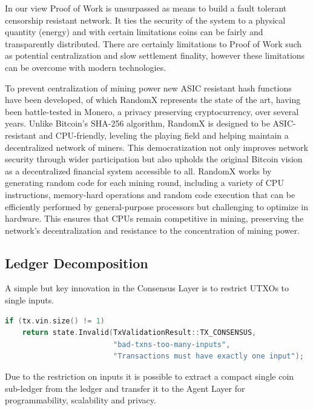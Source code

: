 \documentclass{article}
\begin{document}
In our view Proof of Work is unsurpassed as means to build a fault tolerant censorship resistant network. It ties the security of the system to a physical quantity (energy) and with certain limitations coins can be fairly and transparently distributed. There are certainly limitations to Proof of Work such as potential centralization and slow settlement finality, however these limitations can be overcome with modern technologies.

To prevent centralization of mining power new ASIC resistant hash functions have been developed, of which RandomX represents the state of the art, having been battle-tested in Monero, a privacy preserving cryptocurrency, over several years. Unlike Bitcoin's SHA-256 algorithm, RandomX is designed to be ASIC-resistant and CPU-friendly, leveling the playing field and helping maintain a decentralized network of miners. This democratization not only improves network security through wider participation but also upholds the original Bitcoin vision as a decentralized financial system accessible to all. RandomX works by generating random code for each mining round, including a variety of CPU instructions, memory-hard operations and random code execution that can be efficiently performed by general-purpose processors but challenging to optimize in hardware. This ensures that CPUs remain competitive in mining, preserving the network's decentralization and resistance to the concentration of mining power.




\subsection{Ledger Decomposition}


A simple but key innovation in the Consensus Layer is to restrict UTXOs to single inputs.

\begin{minipage}{\linewidth}
\begin{lstlisting}[language=C++]
if (tx.vin.size() != 1)
    return state.Invalid(TxValidationResult::TX_CONSENSUS,
                         "bad-txns-too-many-inputs",
                         "Transactions must have exactly one input");
\end{lstlisting}
\end{minipage}

Due to the restriction on inputs it is possible to extract a compact single coin sub-ledger from the ledger and transfer it to the Agent Layer for programmability, scalability and privacy.
\end{document}
